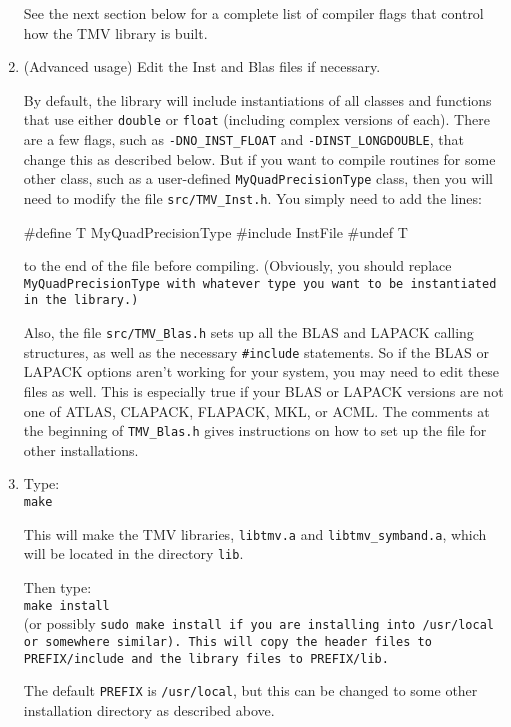 \begin{enumerate}
See the next section below for a complete list of compiler flags that control how the TMV library is built.

\item
(Advanced usage) Edit the Inst and Blas files if necessary.

By default, the library will include instantiations of all classes and 
functions
that use either \texttt{double} or \texttt{float} (including complex versions of each).  
There are a few flags, such as 
\texttt{-DNO\_INST\_FLOAT} and \texttt{-DINST\_LONGDOUBLE},
that change this as described below.  
But if you want to compile routines for some other class, such as a user-defined
\texttt{MyQuadPrecisionType} class, then you will need to modify the file 
\texttt{src/TMV\_Inst.h}.
You simply need to add the lines:
\begin{tmvcode}
#define T MyQuadPrecisionType
#include InstFile
#undef T
\end{tmvcode}
to the end of the file before compiling.  (Obviously, you should
replace \tt{MyQuadPrecisionType} with whatever
type you want to be instantiated in the library.)

Also, the file \texttt{src/TMV\_Blas.h}
sets up all the BLAS and LAPACK calling structures,
as well as the necessary \texttt{\#include} statements.  
So if the BLAS or LAPACK options aren't working 
for your system, you may need to edit these files as well.
This is especially true if your BLAS or LAPACK versions are not one of 
ATLAS, CLAPACK, FLAPACK, MKL, or ACML.  The comments at the beginning of 
\texttt{TMV\_Blas.h} gives instructions on how to set up the file for 
other installations.

\item
Type: \\
\texttt{make}

This will make the TMV libraries, \texttt{libtmv.a} and \texttt{libtmv\_symband.a},
which will be located in the directory \texttt{lib}.

Then type:\\
\texttt{make install}\\
(or possibly \tt{sudo make install} if you are installing into \tt{/usr/local} or somewhere similar).
This will copy the header files to \texttt{PREFIX/include} and the library files to
\texttt{PREFIX/lib}.  

The default \texttt{PREFIX} is \texttt{/usr/local}, but this can be changed
to some other installation directory as described above.


\end{enumerate}
